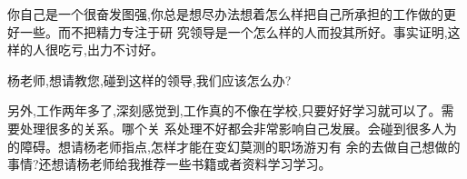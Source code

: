 \documentclass[11pt]{article}
\begin{document}
\begin{comment}
成熟的领导需要能够帮助员工成长。所以``你有不少地方做的不够好''的回答是不够的。领导需要告诉你如何
不好,如何改进,而且这些改进是合情合理的。这样才是成熟的领导。

另一方面,你有跟人家比较的习惯。这样一定做成不满。这就是明证。很简单,你一定是跟考核结果比你好的人比,
你不会跟比自己差的人比。是吧?如果你是客观的,最低限度,你会告诉我,你相对80\%人差,20\%的人好。
我就开始跟你讨论这个问题。但是老实说,如果一个员工能够做到这个水平,他一般已经不会再斤斤计较
这些问题了。因为,要么他的考核结果不会太差,要么他的修养就已经是比较成熟了。

对,修养跟技术水平是有关联的。你要相信这一点。
\end{comment}

\begin{myquote}
  你自己是一个很奋发图强,你总是想尽办法想着怎么样把自己所承担的工作做的更好一些。而不把精力专注于研
  究领导是一个怎么样的人而投其所好。事实证明,这样的人很吃亏,出力不讨好。
\end{myquote}

\begin{comment}
  你这样说,证明你的奋发图强到现在还没有什么效果。否则,你会觉得,你的奋发图强,已经把自己磨练得非常
  能干。这样那里有什么吃亏的?可能你奋发图强的方向、方法可以改善一下?多注意自己的效能水平。在完成任
  务的过程中,做到提高自己。这样才是为自己做事,不是为他人做事。也是在课程里的。

  你自己要好好地问问自己,到底自己的能力水平如何?这个可能的确是你的问题所在。
\end{comment}

\begin{myquote}
杨老师,想请教您,碰到这样的领导,我们应该怎么办?

另外,工作两年多了,深刻感觉到,工作真的不像在学校,只要好好学习就可以了。需要处理很多的关系。哪个关
系处理不好都会非常影响自己发展。会碰到很多人为的障碍。想请杨老师指点,怎样才能在变幻莫测的职场游刃有
余的去做自己想做的事情?还想请杨老师给我推荐一些书籍或者资料学习学习。
\end{myquote}

\begin{comment}
我也遇到过这样的领导。你要么就服从、要么就斗争、要么就离开。如果斗争,就一定会有一个离开。
大部分的情况,我会服从,因为我尊重传统的权威。在日常的工作中,我会尽量通过解决技术的,人事的困难,
通过解决问题,提高自己。我会关注、考虑任务之中自己喜欢的议素,每完成一个任务,都得到一些提高。

注意,每次遇到困难,就换岗位,离职,就是逃避,不是解决问题,对自己没有帮助。换岗位,离职,有
它主动的价值和需要,不是为逃避而为。否则,你是放弃了一个磨练的机会。有困难,要发展处理的能力。否则,
跑到另外一个岗位,你还会遇到很多不同的困难情况不能解决,你的职业生涯,就会是一连串的挫折。

找办法处理好领导的关系。可能自己的期待和能力,还不匹配。心态需要平衡,面对困难,分析自己的问题,
不断找机会磨练。如此积累下来,才有争取达到自己意愿的机会。

你需要明确目标。要有毅力。要刻苦。缺一不可。

谢谢你的努力。希望你的努力带来成果。
\end{comment}
\end{document}
